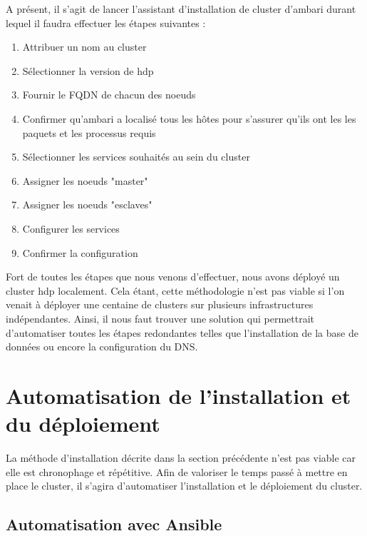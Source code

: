 \documentclass[12pt, french]{report}
\begin{document}
A présent, il s'agit de lancer l'assistant d'installation de cluster d'\gls{ambari} durant lequel il faudra effectuer les étapes suivantes :

\begin{enumerate}
\item Attribuer un nom au cluster
\item Sélectionner la version de \gls{hdp}
\item Fournir le FQDN de chacun des noeuds
\item Confirmer qu'\gls{ambari} a localisé tous les hôtes pour s'assurer qu'ils ont les les paquets et les processus requis
\item Sélectionner les services souhaités au sein du cluster
\item Assigner les noeuds "master"
\item Assigner les noeuds "esclaves"
\item Configurer les services
\item Confirmer la configuration
\end{enumerate}

Fort de toutes les étapes que nous venons d'effectuer, nous avons déployé un cluster \gls{hdp} localement. Cela étant, cette méthodologie n'est pas viable si l'on venait à déployer une centaine de clusters sur plusieurs infrastructures indépendantes. Ainsi, il nous faut trouver une solution qui permettrait d'automatiser toutes les étapes redondantes telles que l'installation de la base de données ou encore la configuration du DNS.

\section{Automatisation de l'installation et du déploiement}

La méthode d'installation décrite dans la section précédente n'est pas viable car elle est chronophage et répétitive. Afin de valoriser le temps passé à mettre en place le cluster, il s'agira d'automatiser l'installation et le déploiement du cluster.

\subsection{Automatisation avec Ansible}
\end{document}
